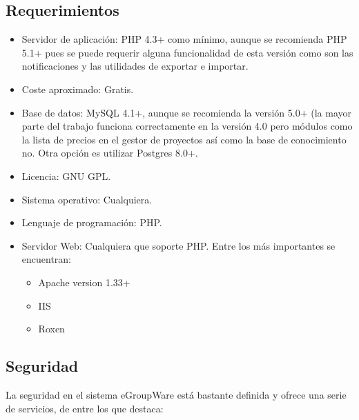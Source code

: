 \subsection{Requerimientos}

\begin{itemize}
	\item Servidor de aplicación: PHP 4.3+ como mínimo, aunque se recomienda PHP 5.1+ pues se puede requerir alguna funcionalidad de esta versión como son las notificaciones y las utilidades de exportar e importar.
	\item Coste aproximado: Gratis.
	\item Base de datos: MySQL 4.1+, aunque se recomienda la versión 5.0+ (la mayor parte del trabajo funciona correctamente en la versión 4.0 pero módulos como la lista de precios en el gestor de proyectos así como la base de conocimiento no. Otra opción es utilizar Postgres 8.0+.
	\item Licencia: GNU GPL.
	\item Sistema operativo: Cualquiera.
	\item Lenguaje de programación: PHP.
	\item Servidor Web: Cualquiera que soporte PHP. Entre los más importantes se encuentran:
	\begin{itemize}
		\item Apache version 1.33+ 
		\item IIS
		\item Roxen
	\end{itemize}
\end{itemize}

\subsection{Seguridad}

La seguridad en el sistema eGroupWare está bastante definida y ofrece una serie de servicios, de entre los que destaca:

